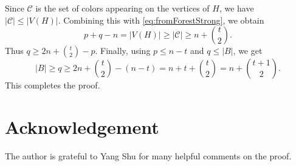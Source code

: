\documentclass[11pt]{article}
\theoremstyle{definition}
\begin{document}
Since \(\mathcal C\) is the set of colors appearing on the vertices of \(H\), we have
\(
    |\mathcal C|\le |V(H)|.
\)
Combining this with \eqref{eq:fromForestStrong}, we obtain
\[
    p+q-n
    =
    |V(H)|
    \ge
    |\mathcal C|
    \ge
    n+\binom{t}{2}.
\]
Thus
\(
    q\ge 2n+\binom{t}{2}-p.
\)
Finally, using \(p\le n-t\) and \(q\le |B|\), we get
\[
    |B|
    \ge q
    \ge
    2n+\binom{t}{2}-(n-t)
    =
    n+t+\binom{t}{2}
    =
    n+\binom{t+1}{2}.
\]
This completes the proof.

\section*{Acknowledgement}
The author is grateful to Yang Shu for many helpful comments on the proof.



\end{document}
